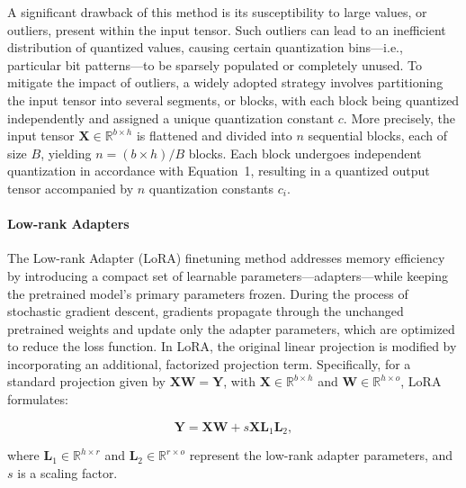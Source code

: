 A significant drawback of this method is its susceptibility to large values, or outliers, present within the input tensor. Such outliers can lead to an inefficient distribution of quantized values, causing certain quantization bins—i.e., particular bit patterns—to be sparsely populated or completely unused. To mitigate the impact of outliers, a widely adopted strategy involves partitioning the input tensor into several segments, or blocks, with each block being quantized independently and assigned a unique quantization constant $c$. More precisely, the input tensor $\mathbf{X}\in \mathbb{R}^{b\times h}$ is flattened and divided into $n$ sequential blocks, each of size $B$, yielding ${n = ({b\times h} )/{B} }$ blocks. Each block undergoes independent quantization in accordance with Equation~1, resulting in a quantized output tensor accompanied by $n$ quantization constants $c_i$.

\paragraph{Low-rank Adapters} The Low-rank Adapter (LoRA) finetuning method \citep{hu2021lora} addresses memory efficiency by introducing a compact set of learnable parameters—adapters—while keeping the pretrained model’s primary parameters frozen. During the process of stochastic gradient descent, gradients propagate through the unchanged pretrained weights and update only the adapter parameters, which are optimized to reduce the loss function. In LoRA, the original linear projection is modified by incorporating an additional, factorized projection term. Specifically, for a standard projection given by ${\mathbf{X} \mathbf{W} = \mathbf{Y}}$, with $\mathbf{X}\in  \mathbb{R}^{b\times h}$ and $\mathbf{W}\in  \mathbb{R}^{h\times o}$, LoRA formulates:

\begin{equation}
    \mathbf{Y} = \mathbf{X}\mathbf{W} + s\mathbf{X}\mathbf{L}_1\mathbf{L}_2,
\end{equation}

where $\mathbf{L}_1\in  \mathbb{R}^{h\times r}$ and $\mathbf{L}_2\in  \mathbb{R}^{r\times o}$ represent the low-rank adapter parameters, and $s$ is a scaling factor.


